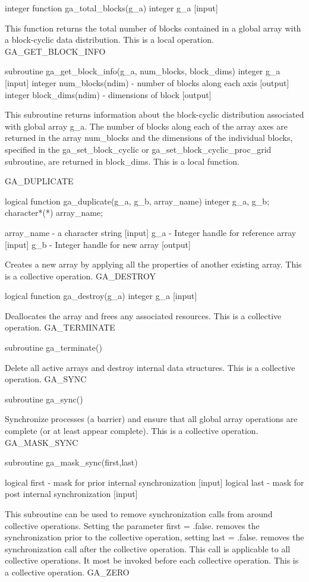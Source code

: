 integer function ga\_total\_blocks(g\_a) integer g\_a {[}input{]}

This function returns the total number of blocks contained in a global
array with a block-cyclic data distribution. This is a local operation.
GA\_GET\_BLOCK\_INFO

subroutine ga\_get\_block\_info(g\_a, num\_blocks, block\_dims) integer
g\_a {[}input{]} integer num\_blocks(ndim) - number of blocks along
each axis {[}output{]} integer block\_dims(ndim) - dimensions of block
{[}output{]}

This subroutine returns information about the block-cyclic distribution
associated with global array g\_a. The number of blocks along each
of the array axes are returned in the array num\_blocks and the dimensions
of the individual blocks, specified in the ga\_set\_block\_cyclic
or ga\_set\_block\_cyclic\_proc\_grid subroutine, are returned in
block\_dims. This is a local function.

GA\_DUPLICATE

logical function ga\_duplicate(g\_a, g\_b, array\_name) integer g\_a,
g\_b; character{*}({*}) array\_name;

array\_name - a character string {[}input{]} g\_a - Integer handle
for reference array {[}input{]} g\_b - Integer handle for new array
{[}output{]}

Creates a new array by applying all the properties of another existing
array. This is a collective operation. GA\_DESTROY

logical function ga\_destroy(g\_a) integer g\_a {[}input{]}

Deallocates the array and frees any associated resources. This is
a collective operation. GA\_TERMINATE

subroutine ga\_terminate()

Delete all active arrays and destroy internal data structures. This
is a collective operation. GA\_SYNC

subroutine ga\_sync()

Synchronize processes (a barrier) and ensure that all global array
operations are complete (or at least appear complete). This is a collective
operation. GA\_MASK\_SYNC

subroutine ga\_mask\_sync(first,last)

logical first - mask for prior internal synchronization {[}input{]}
logical last - mask for post internal synchronization {[}input{]}

This subroutine can be used to remove synchronization calls from around
collective operations. Setting the parameter first = .false. removes
the synchronization prior to the collective operation, setting last
= .false. removes the synchronization call after the collective operation.
This call is applicable to all collective operations. It most be invoked
before each collective operation. This is a collective operation.
GA\_ZERO

